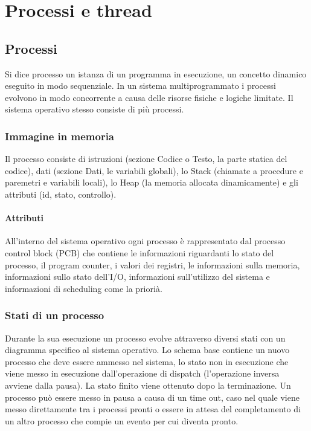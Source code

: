 \chapter{Processi e thread}
\section{Processi}
Si dice processo un istanza di un programma in esecuzione, un concetto dinamico eseguito in modo sequenziale. In un sistema multiprogrammato i processi evolvono in modo concorrente a 
causa delle risorse fisiche e logiche limitate. Il sistema operativo stesso consiste di pi\`u processi. 
\subsection{Immagine in memoria}
Il processo consiste di istruzioni (sezione Codice o Testo, la parte statica del codice), dati (sezione Dati, le variabili globali), lo Stack (chiamate a procedure e paremetri e 
variabili locali), lo Heap (la memoria allocata dinamicamente) e gli attributi (id, stato, controllo).
\subsubsection{Attributi}
All'interno del sistema operativo ogni processo \`e rappresentato dal processo control block (PCB) che contiene le informazioni riguardanti lo stato del processo, il program counter, 
i valori dei registri, le informazioni sulla memoria, informazioni sullo stato dell'I/O, informazioni sull'utilizzo del sistema e informazioni di scheduling come la priori\`a. 
\subsection{Stati di un processo}
Durante la sua esecuzione un processo evolve attraverso diversi stati con un diagramma specifico al sistema operativo. Lo schema base contiene un nuovo processo che deve essere 
ammesso nel sistema, lo stato non in esecuzione che viene messo in esecuzione dall'operazione di dispatch (l'operazione inversa avviene dalla pausa). La stato finito viene ottenuto
dopo la terminazione. Un processo pu\`o essere messo in pausa a causa di un time out, caso nel quale viene messo direttamente tra i processi pronti o essere in attesa del completamento 
di un altro processo che compie un evento per cui diventa pronto. 
